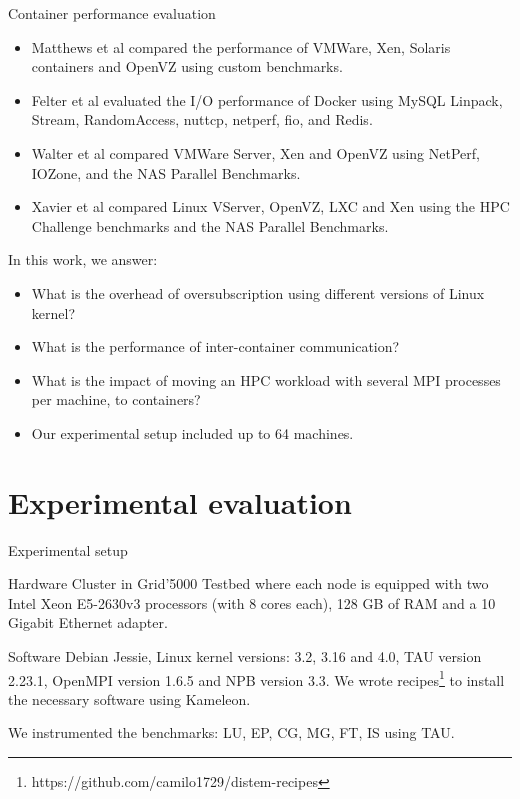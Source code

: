 \documentclass[presentation]{beamer}
\begin{document}
\begin{frame}[label=sec-2-2]{Container performance evaluation}
\begin{itemize}
\item Matthews et al\cite{matthews2007quantifying} compared the performance of VMWare,
Xen, Solaris containers and OpenVZ using custom benchmarks.
\item Felter et al\cite{ibmtrdocker} evaluated the I/O performance of Docker using MySQL
Linpack, Stream, RandomAccess, nuttcp, netperf, fio, and Redis.
\item Walter et al\cite{4482796} compared VMWare Server, Xen and OpenVZ using NetPerf, IOZone, and the NAS Parallel Benchmarks.

\item Xavier et al\cite{6498558} compared Linux VServer, OpenVZ,
LXC and Xen using the HPC Challenge benchmarks and the NAS
Parallel Benchmarks.
\end{itemize}
\end{frame}

{
\begin{frame}[label=sec-2-3]{In this work, we answer:}



\begin{itemize}
\item What is the overhead of oversubscription using different versions of Linux kernel?
\item What is the performance of inter-container communication?
\item What is the impact of moving an HPC workload with several MPI processes per machine, to containers?
\item Our experimental setup included up to 64 machines.
\end{itemize}
\end{frame}
}



\section{Experimental evaluation}
\label{sec-3}

\begin{frame}[label=sec-3-1]{Experimental setup}
\begin{block}{Hardware}
Cluster in Grid'5000 Testbed\cite{grid5000} where each node is equipped with two Intel Xeon E5-2630v3 processors (with 8 cores each), 128 GB of RAM and
a 10 Gigabit Ethernet adapter.
\end{block}

\begin{block}{Software}
Debian Jessie, Linux kernel versions: 3.2, 3.16 and 4.0, TAU version 2.23.1, OpenMPI version 1.6.5 and NPB version 3.3.
We wrote recipes\footnote{https://github.com/camilo1729/distem-recipes} to install the necessary software using
Kameleon\cite{Ruiz:2015:RSA:2723872.2723883}.

We instrumented the benchmarks: LU, EP, CG, MG, FT, IS using TAU\cite{Shende06thetau}.
\end{block}
\end{frame}
\end{document}

